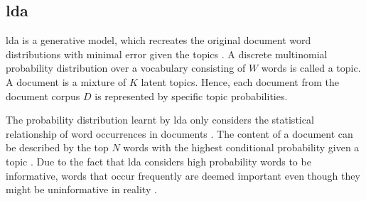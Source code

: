 
\subsection{\ac{lda}}\label{subsec:latent-dirichlet-allocation}

\ac{lda} is a generative model, which recreates the original document word distributions with minimal error given the topics \cite{topic_modeling2015, Top2Vec2020}.
A discrete multinomial probability distribution over a vocabulary consisting of $W$ words is called a topic.
A document is a mixture of $K$ latent topics.
Hence, each document from the document corpus $D$ is represented by specific topic probabilities.

The probability distribution learnt by \ac{lda} only considers the statistical relationship of word occurrences in documents \cite{Topic2Vec2015}.
The content of a document can be described by the top $N$ words with the highest conditional probability given a topic \cite{Topic2Vec2015}.
Due to the fact that \ac{lda} considers high probability words to be informative, words 
that occur frequently are deemed important even though they might be uninformative in reality \cite{Top2Vec2020, Topic2Vec2015}.

